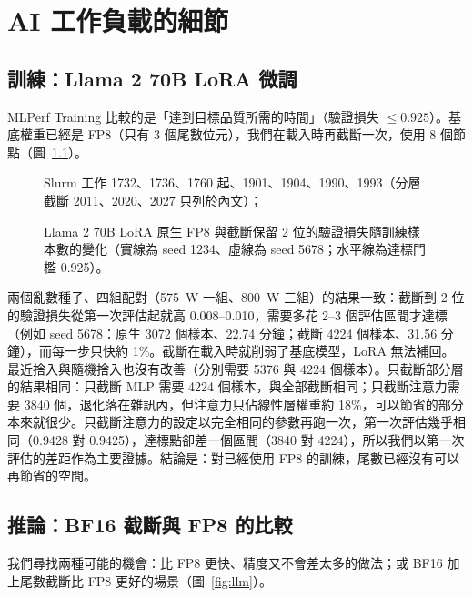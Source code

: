 \chapter{AI 工作負載的細節}\label{app:ai}

\section{訓練：Llama 2 70B LoRA 微調}\label{sec:ai-lora}

MLPerf Training 比較的是「達到目標品質所需的時間」（驗證損失 $\le 0.925$）。基底權重已經是 FP8（只有 3 個尾數位元），我們在載入時再截斷一次，使用 8 個節點（圖~\ref{fig:lora}）。

\begin{figure}[tbp]
\centering
{}
\caption[Llama 2 70B LoRA 的驗證損失：原生與截斷 2 位]{Llama 2 70B LoRA 原生 FP8 與截斷保留 2 位的驗證損失隨訓練樣本數的變化（實線為 seed 1234、虛線為 seed 5678；水平線為達標門檻 0.925）。}\label{fig:lora}
\begin{figsource}Slurm 工作 1732、1736、1760 起、1901、1904、1990、1993（分層截斷 2011、2020、2027 只列於內文）；\end{figsource}
\end{figure}

兩個亂數種子、四組配對（575~W 一組、800~W 三組）的結果一致：截斷到 2 位的驗證損失從第一次評估起就高 0.008–0.010，需要多花 2–3 個評估區間才達標（例如 seed 5678：原生 3072 個樣本、22.74 分鐘；截斷 4224 個樣本、31.56 分鐘），而每一步只快約 1\%。截斷在載入時就削弱了基底模型，LoRA 無法補回。最近捨入與隨機捨入也沒有改善（分別需要 5376 與 4224 個樣本）。只截斷部分層的結果相同：只截斷 MLP 需要 4224 個樣本，與全部截斷相同；只截斷注意力需要 3840 個，退化落在雜訊內，但注意力只佔線性層權重約 18\%，可以節省的部分本來就很少。只截斷注意力的設定以完全相同的參數再跑一次，第一次評估幾乎相同（0.9428 對 0.9425），達標點卻差一個區間（3840 對 4224），所以我們以第一次評估的差距作為主要證據。結論是：對已經使用 FP8 的訓練，尾數已經沒有可以再節省的空間。

\section{推論：BF16 截斷與 FP8 的比較}\label{sec:ai-infer}

我們尋找兩種可能的機會：比 FP8 更快、精度又不會差太多的做法；或 BF16 加上尾數截斷比 FP8 更好的場景（圖~\ref{fig:llm}）。

